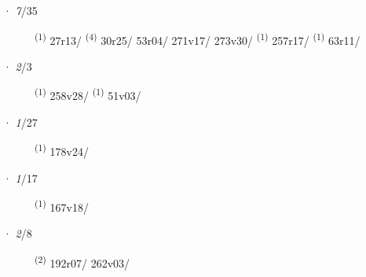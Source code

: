 \ENTRYEND
\noindent{} · \textit{7}/35 \LEMMALINE
\begin{description}
    \item[]  \textsuperscript{(1)} \mbox{27r13/} \CASEBREAK {} \textsuperscript{(4)} \mbox{30r25/} \mbox{53r04/} \mbox{271v17/} \mbox{273v30/} \textsuperscript{(1)} \mbox{257r17/} \CASEBREAK {} \textsuperscript{(1)} \mbox{63r11/}
\end{description}
\ENTRYEND
\noindent{} · \textit{2}/3 \LEMMALINE
\begin{description}
    \item[]  \textsuperscript{(1)} \mbox{258v28/} \CASEBREAK {} \textsuperscript{(1)} \mbox{51v03/}
\end{description}
\ENTRYEND
\noindent{} · \textit{1}/27 \LEMMALINE
\begin{description}
    \item[]  \textsuperscript{(1)} \mbox{178v24/}
\end{description}
\ENTRYEND
\noindent{} · \textit{1}/17 \LEMMALINE
\begin{description}
    \item[]  \textsuperscript{(1)} \mbox{167v18/}
\end{description}
\ENTRYEND
\noindent{} · \textit{2}/8 \LEMMALINE
\begin{description}
    \item[]  \textsuperscript{(2)} \mbox{192r07/} \mbox{262v03/}
\end{description}
